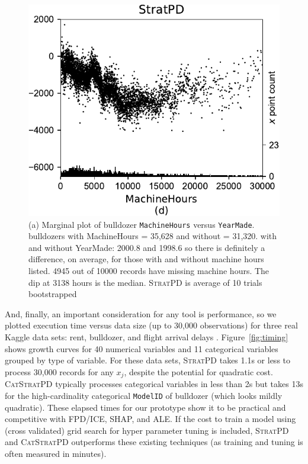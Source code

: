 \documentclass{article}
\newcommand{\figref}[1]{Figure~\ref{#1}}
\newcommand{\spd}{\fontfamily{cmr}\textsc{\small StratPD}}
\newcommand{\cspd}{\fontfamily{cmr}\textsc{\small CatStratPD}}
\begin{document}
{\begin{figure}[htbp]
\begin{center}
\includegraphics[scale=0.35]{images/bulldozer_MachineHours_stratpd.pdf}
\caption{\small (a) Marginal plot of bulldozer {\tt MachineHours} versus {\tt YearMade}.  bulldozers with MachineHours = 35,628 and without = 31,320. with and without YearMade: 2000.8 and 1998.6 so there is definitely a difference, on average, for those with and without machine hours listed. 4945 out of 10000 records have missing machine hours.  The dip at 3138 hours is the median. \spd{} is average of 10 trials bootstrapped}
\label{fig:machinehours}
\end{center}
\end{figure}
}

And, finally, an important consideration for any tool is performance, so we plotted execution time versus data size (up to 30,000 observations) for three real Kaggle data sets: rent, bulldozer, and flight arrival delays \cite{flights}. \figref{fig:timing} shows growth curves for 40 numerical variables and 11 categorical variables grouped by type of variable.  For these data sets, \spd{} takes 1.1s or less to process 30,000 records for any $x_j$, despite the potential for quadratic cost. \cspd{} typically processes categorical variables in less than 2s but takes 13s for the high-cardinality categorical {\tt\small ModelID} of bulldozer (which looks mildly quadratic).  These elapsed times for our prototype show it to be practical and competitive with FPD/ICE, SHAP, and ALE.  If the cost to train a model using (cross validated) grid search for hyper parameter tuning is included, \spd{} and \cspd{} outperforms these existing techniques (as training and tuning is often measured in minutes).
\end{document}
